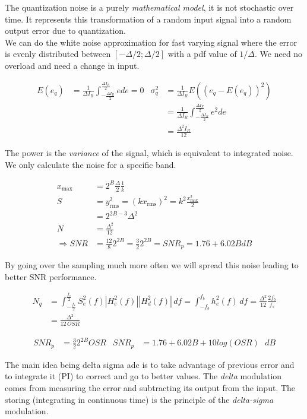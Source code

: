 \documentclass{report}
\begin{document}
The quantization noise is a purely \textit{mathematical model}, it is not stochastic over time. It represents this transformation of a random input signal into a random output error due to quantization.\\

We can do the white noise approximation for fast varying signal where the error is evenly distributed between $[-\Delta/2;\Delta/2]$ with a pdf value of $1/\Delta$. We need no overload and need a change in input.

\begin{align}
    E(e_q) &= \frac{1}{\Delta I_R} \int_{-\frac{\Delta I_R}{2}}^{\frac{\Delta I_R}{2}} e de = 0 & \sigma_q^2&= \frac{1}{\Delta I_R} E((e_q-E(e_q))^2)\\
    & & &=\frac{1}{\Delta I_R} \int_{-\frac{\Delta I_R}{2}}^{\frac{\Delta I_R}{2}} e^2 de\\
    & & &= \frac{\Delta^2 I_R}{12}
\end{align}

The power is the \textit{variance} of the signal, which is equivalent to integrated noise. We only calculate the noise for a specific band.

\begin{align}
x_{\max} &= 2^B \frac{\Delta}{2} \frac{1}{k} \\ 
S &= y_{\text{rms}}^2 = (k x_{\text{rms}})^2 = k^2 \frac{x_{\max}^2}{2} \\ 
&= 2^{2B - 3} \Delta^2 \\ 
N &= \frac{\Delta^2}{12} \\ 
\Rightarrow SNR &= \frac{12}{8} 2^{2B} = \frac{3}{2} 2^{2B} = SNR_p = 1.76+6.02 B dB
\end{align}

By going over the sampling much more often we will spread this noise leading to better SNR performance.

\begin{align}
N_q &= \int_{-\frac{f_s}{2}}^{\frac{f_s}{2}} S_e^2(f) |H_e^2(f)| |H_d^2(f)| \, df = \int_{-f_b}^{f_b} h_e^2(f) \, df = \frac{\Delta^2}{12} \frac{2 f_b}{f_s} \\
&= \frac{\Delta^2}{12 \, OSR}
\end{align}

\begin{align}
SNR_p &= \frac{3}{2} 2^{2B} OSR & SNR_p &= 1.76 + 6.02 B  + 10 log(OSR) \text{ } dB
\end{align}

The main idea being delta sigma \gls{adc} is to take advantage of previous error and to integrate it (PI) to correct and go to better values. The \textit{delta} modulation comes from measuring the error and subtracting its output from the input. The storing (integrating in continuous time) is the principle of the \textit{delta-sigma} modulation.
\end{document}

